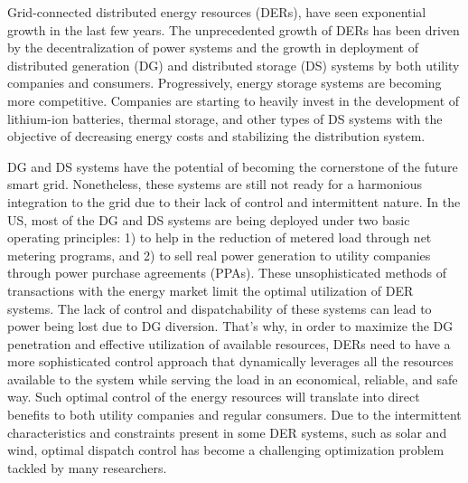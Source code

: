
Grid-connected distributed energy resources (DERs), have seen exponential growth in the last few years. The unprecedented growth of DERs has been driven by the decentralization of power systems and the growth in deployment of distributed generation (DG) and distributed storage (DS) systems by both utility companies and consumers. Progressively, energy storage systems are becoming more competitive. Companies are starting to heavily invest in the development of lithium-ion batteries, thermal storage, and other types of DS systems with the objective of decreasing energy costs and stabilizing the distribution system. 

DG and DS systems have the potential of becoming the cornerstone of the future smart grid. Nonetheless, these systems are still not ready for a harmonious integration to the grid due to their lack of control and intermittent nature\cite{denholm2016path}. In the US, most of the DG and DS systems are being deployed under two basic operating principles: 1) to help in the reduction of metered load through net metering programs, and 2) to sell real power generation to utility companies through power purchase agreements (PPAs). These unsophisticated methods of transactions with the energy market limit the optimal utilization of DER systems. The lack of control and dispatchability of these systems can lead to power being lost due to DG diversion. That's why, in order to maximize the DG penetration and effective utilization of available resources, DERs need to have a more sophisticated control approach that dynamically leverages all the resources available to the system while serving the load in an economical, reliable, and safe way. Such optimal control of the energy resources will translate into direct benefits to both utility companies and regular consumers. Due to the intermittent characteristics and constraints present in some DER systems, such as solar and wind, optimal dispatch control has become a challenging optimization problem tackled by many researchers.

